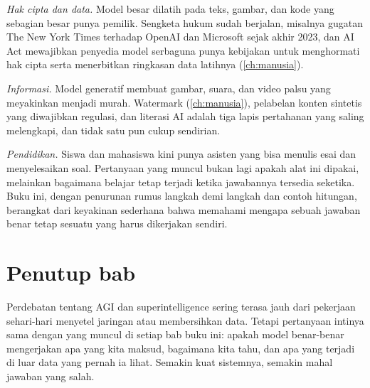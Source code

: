 \emph{Hak cipta dan data.} Model besar dilatih pada teks, gambar, dan kode yang sebagian besar punya pemilik. Sengketa hukum sudah
berjalan, misalnya gugatan The New York Times terhadap OpenAI dan Microsoft sejak akhir 2023, dan AI Act mewajibkan penyedia model
serbaguna punya kebijakan untuk menghormati hak cipta serta menerbitkan ringkasan data latihnya (\cref{ch:manusia}).

\emph{Informasi.} Model generatif membuat gambar, suara, dan video palsu yang meyakinkan menjadi murah. Watermark (\cref{ch:manusia}),
pelabelan konten sintetis yang diwajibkan regulasi, dan literasi AI adalah tiga lapis pertahanan yang saling melengkapi, dan tidak satu
pun cukup sendirian.

\emph{Pendidikan.} Siswa dan mahasiswa kini punya asisten yang bisa menulis esai dan menyelesaikan soal. Pertanyaan yang muncul bukan
lagi apakah alat ini dipakai, melainkan bagaimana belajar tetap terjadi ketika jawabannya tersedia seketika. Buku ini, dengan penurunan
rumus langkah demi langkah dan contoh hitungan, berangkat dari keyakinan sederhana bahwa memahami mengapa sebuah jawaban benar tetap
sesuatu yang harus dikerjakan sendiri.

\section{Penutup bab}

Perdebatan tentang AGI dan superintelligence sering terasa jauh dari pekerjaan sehari-hari menyetel jaringan atau membersihkan data.
Tetapi pertanyaan intinya sama dengan yang muncul di setiap bab buku ini: apakah model benar-benar mengerjakan apa yang kita maksud,
bagaimana kita tahu, dan apa yang terjadi di luar data yang pernah ia lihat. Semakin kuat sistemnya, semakin mahal jawaban yang salah.

